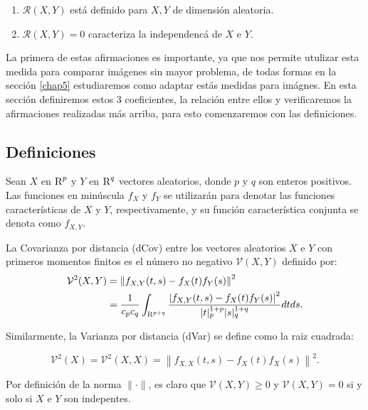 \begin{enumerate}
	\item $\mathcal{R}(X,Y)$ est\'a definido para $X,Y$ de dimensi\'on aleatoria.
	\item $\mathcal{R}(X,Y) = 0$ caracteriza la independenc\'a de $X$ e $Y$.	 
\end{enumerate}

La primera de estas afirmaciones es importante, ya que nos permite utulizar esta medida para comparar im\'agenes sin mayor problema, de todas formas en la secci\'on \ref{chap5} estudiaremos como adaptar est\'as medidas para im\'agnes. En esta secci\'on definiremos estos 3 coeficientes, la relaci\'on entre ellos y verificaremos la afirmaciones realizadas m\'as arriba, para esto comenzaremos con las definiciones. 

\subsection{Definiciones}

Sean $X$ en $\textsc{R}^p$ y $Y$ en $\textsc{R}^q$ vectores aleatorios, donde $p$ y $q$ son enteros positivos. Las funciones en min\'uscula $f_X$ y $f_Y$ se utilizarán para denotar las funciones caracter\'isticas de $X$ y $Y$, respectivamente, y su funci\'on caracter\'istica conjunta se denota como $f_{X, Y}$. 

\begin{defn}
	La Covarianza por distancia (dCov) entre los vectores aleatorios $X$ e $Y$ con primeros momentos finitos es el n\'umero no negativo $\mathcal{V}(X, Y)$ definido por:
	\begin{equation}
		\begin{aligned}\label{dcov_formula}
			\mathcal{V}^2(X, Y) & =\left\|f_{X, Y}(t, s)-f_X(t) f_Y(s)\right\|^2 \\
			& =\frac{1}{c_p c_q} \int_{\textsc{R}^{p+q}} \frac{\left|f_{X, Y}(t, s)-f_X(t) f_Y(s)\right|^2}{|t|_p^{1+p}|s|_q^{1+q}} d t d s .
			\end{aligned}
	\end{equation}

	\end{defn}

	Similarmente, la Varianza por distancia (dVar) se define como la raiz cuadrada:

	$$
	\mathcal{V}^2(X)=\mathcal{V}^2(X, X)=\left\|f_{X, X}(t, s)-f_X(t) f_X(s)\right\|^2 .
	$$

	Por definici\'on de la norma $\|\cdot\|$, es claro que  $\mathcal{V}(X, Y) \geq 0$ y $\mathcal{V}(X, Y)=0$ si y solo si $X$ e $Y$ son indepentes.

